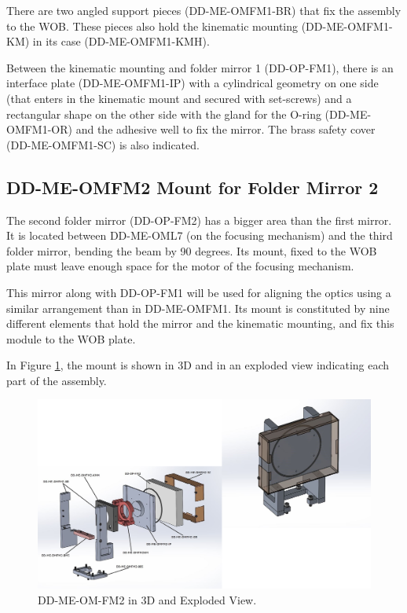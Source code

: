 \documentclass{report}
\begin{document}
There are two angled support pieces (DD-ME-OMFM1-BR) that fix the assembly to the WOB. These pieces also hold the kinematic mounting (DD-ME-OMFM1-KM) in its case (DD-ME-OMFM1-KMH).

Between the kinematic mounting and folder mirror 1 (DD-OP-FM1), there is an interface plate (DD-ME-OMFM1-IP) with a cylindrical geometry on one side (that enters in the kinematic mount and secured with set-screws) and a rectangular shape on the other side with the gland for the O-ring (DD-ME-OMFM1-OR) and the adhesive well to fix the mirror. The brass safety cover (DD-ME-OMFM1-SC) is also indicated.

\subsection{DD-ME-OMFM2 Mount for Folder Mirror 2}

The second folder mirror (DD-OP-FM2) has a bigger area than the first mirror. It is located between DD-ME-OML7 (on the focusing mechanism) and the third folder mirror, bending the beam by 90 degrees. Its mount, fixed to the WOB plate must leave enough space for the motor of the focusing mechanism.

This mirror along with DD-OP-FM1 will be used for aligning the optics using a similar arrangement than in DD-ME-OMFM1. Its mount is constituted by nine different elements that hold the mirror and the kinematic mounting, and fix this module to the WOB plate.

In Figure \ref{figure:FM2}, the mount is shown in 3D and in an exploded view indicating each part of the assembly.

\begin{figure}
\begin{center}
\includegraphics[width=1.0\linewidth]{figures/FM2-ExV.png}
\end{center}
\caption{DD-ME-OM-FM2 in 3D and Exploded View.}
\label{figure:FM2}
\end{figure}
\end{document}
